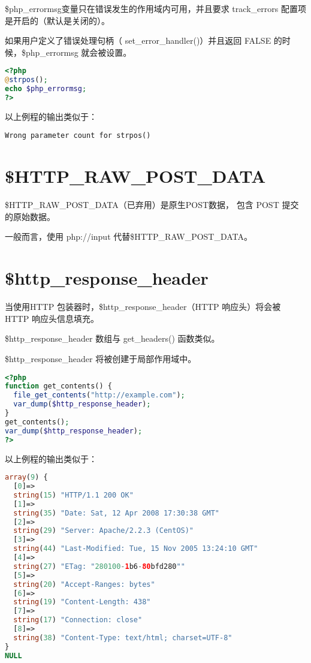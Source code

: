 \$php\_errormsg变量只在错误发生的作用域内可用，并且要求 track\_errors 配置项是开启的（默认是关闭的）。

如果用户定义了错误处理句柄（ set\_error\_handler()）并且返回 FALSE 的时候，\$php\_errormsg 就会被设置。



\begin{lstlisting}[language=PHP]
<?php
@strpos();
echo $php_errormsg;
?>
\end{lstlisting}


以上例程的输出类似于：

\begin{verbatim}
Wrong parameter count for strpos()
\end{verbatim}






\section{\$HTTP\_RAW\_POST\_DATA}


\$HTTP\_RAW\_POST\_DATA（已弃用）是原生POST数据， 包含 POST 提交的原始数据。

一般而言，使用 php://input 代替\$HTTP\_RAW\_POST\_DATA。



\section{\$http\_response\_header}

当使用HTTP 包装器时，\$http\_response\_header（HTTP 响应头）将会被 HTTP 响应头信息填充。


\begin{compactitem}
\item \$http\_response\_header 数组与 get\_headers() 函数类似。
\item \$http\_response\_header 将被创建于局部作用域中。
\end{compactitem}





\begin{lstlisting}[language=PHP]
<?php
function get_contents() {
  file_get_contents("http://example.com");
  var_dump($http_response_header);
}
get_contents();
var_dump($http_response_header);
?>
\end{lstlisting}


以上例程的输出类似于：


\begin{lstlisting}[language=PHP]
array(9) {
  [0]=>
  string(15) "HTTP/1.1 200 OK"
  [1]=>
  string(35) "Date: Sat, 12 Apr 2008 17:30:38 GMT"
  [2]=>
  string(29) "Server: Apache/2.2.3 (CentOS)"
  [3]=>
  string(44) "Last-Modified: Tue, 15 Nov 2005 13:24:10 GMT"
  [4]=>
  string(27) "ETag: "280100-1b6-80bfd280""
  [5]=>
  string(20) "Accept-Ranges: bytes"
  [6]=>
  string(19) "Content-Length: 438"
  [7]=>
  string(17) "Connection: close"
  [8]=>
  string(38) "Content-Type: text/html; charset=UTF-8"
}
NULL
\end{lstlisting}






